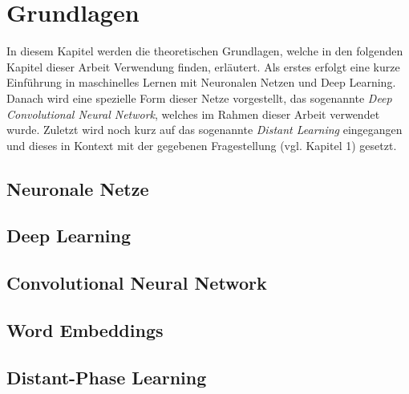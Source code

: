 \chapter{Grundlagen}
In diesem Kapitel werden die theoretischen Grundlagen, welche in den  folgenden Kapitel dieser Arbeit Verwendung finden, erläutert. Als erstes erfolgt eine kurze Einführung in maschinelles Lernen mit Neuronalen Netzen und Deep Learning. Danach wird eine spezielle Form dieser Netze vorgestellt, das sogenannte \emph{Deep Convolutional Neural Network}, welches im Rahmen dieser Arbeit verwendet wurde. Zuletzt wird noch kurz auf das sogenannte \emph{Distant Learning} \cite{deriu2016sentiment} eingegangen und dieses in Kontext mit der gegebenen Fragestellung (vgl. Kapitel 1) gesetzt.

\section{Neuronale Netze}
\blindtext
\section{Deep Learning}
\blindtext
\section{Convolutional Neural Network}
\blindtext
\section{Word Embeddings}
\blindtext
\section{Distant-Phase Learning}
\blindtext